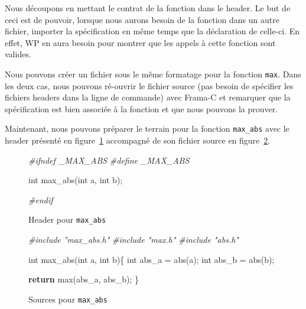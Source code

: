 \documentclass[12pt,francais,]{scrbook}
\newenvironment{Shaded}{}{}
\newcommand{\KeywordTok}[1]{\textcolor[rgb]{0.00,0.44,0.13}{\textbf{{#1}}}}
\newcommand{\DataTypeTok}[1]{\textcolor[rgb]{0.56,0.13,0.00}{{#1}}}
\newcommand{\CommentTok}[1]{\textcolor[rgb]{0.38,0.63,0.69}{\textit{{#1}}}}
\newcommand{\NormalTok}[1]{{#1}}
\begin{document}
Nous découpons en mettant le contrat de la fonction dans le header. Le
but de ceci est de pouvoir, lorsque nous aurons besoin de la fonction
dans un autre fichier, importer la spécification en même temps que la
déclaration de celle-ci. En effet, WP en aura besoin pour montrer que
les appels à cette fonction sont valides.

Nous pouvons créer un fichier sous le même formatage pour la fonction
\texttt{max}. Dans les deux cas, nous pouvons ré-ouvrir le fichier
source (pas besoin de spécifier les fichiers headers dans la ligne de
commande) avec Frama-C et remarquer que la spécification est bien
associée à la fonction et que nous pouvons la prouver.

Maintenant, nous pouvons préparer le terrain pour la fonction
\texttt{max\_abs} avec le header présenté en figure~\ref{fig:3-4-hd2}
accompagné de son fichier source en figure~\ref{fig:3-4-src2}.

\begin{figure}
  \centering
\begin{footnotesize}\begin{Shaded}
\begin{Highlighting}[]
\CommentTok{#ifndef _MAX_ABS}
\CommentTok{#define _MAX_ABS}

\DataTypeTok{int} \NormalTok{max_abs(}\DataTypeTok{int} \NormalTok{a, }\DataTypeTok{int} \NormalTok{b);}

\CommentTok{#endif}
\end{Highlighting}
\end{Shaded}\end{footnotesize}
\caption{Header pour \texttt{max\_abs}}
\label{fig:3-4-hd2}
\end{figure}

\begin{figure}
  \centering
\begin{footnotesize}\begin{Shaded}
\begin{Highlighting}[]
\CommentTok{#include "max_abs.h"}
\CommentTok{#include "max.h"}
\CommentTok{#include "abs.h"}

\DataTypeTok{int} \NormalTok{max_abs(}\DataTypeTok{int} \NormalTok{a, }\DataTypeTok{int} \NormalTok{b)\{}
  \DataTypeTok{int} \NormalTok{abs_a = abs(a);}
  \DataTypeTok{int} \NormalTok{abs_b = abs(b);}

  \KeywordTok{return} \NormalTok{max(abs_a, abs_b);}
\NormalTok{\}}
\end{Highlighting}
\end{Shaded}\end{footnotesize}
\caption{Sources pour \texttt{max\_abs}}
\label{fig:3-4-src2}
\end{figure}
\end{document}
